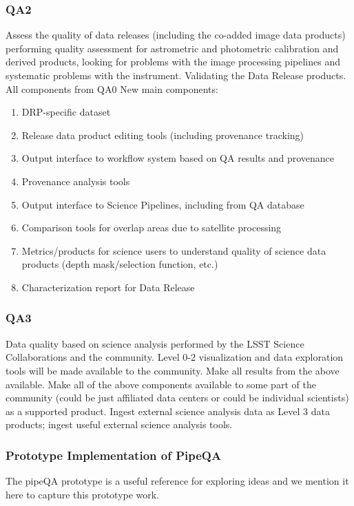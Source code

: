 \subsubsection{QA2}
Assess the quality of data releases (including the co-added image data products) performing quality assessment for astrometric and photometric calibration and derived products, looking for problems with the image processing pipelines and systematic problems with the instrument.
Validating the Data Release products.
All components from QA0
New main components:
\begin{enumerate}
\item DRP-specific dataset
\item Release data product editing tools (including provenance tracking)
\item Output interface to workflow system based on QA results and provenance
\item Provenance analysis tools
\item Output interface to Science Pipelines, including from QA database
\item Comparison tools for overlap areas due to satellite processing
\item Metrics/products for science users to understand quality of science data products (depth mask/selection function, etc.)
\item Characterization report for Data Release
\end{enumerate}

\subsubsection{QA3}
Data quality based on science analysis performed by the LSST Science Collaborations and the community. Level 0-2 visualization and data exploration tools will be made available to the community.
Make all results from the above available. Make all of the above components available to some part of the community (could be just affiliated data centers or could be individual scientists) as a supported product.
Ingest external science analysis data as Level 3 data products; ingest useful external science analysis tools.

\subsubsection{Prototype Implementation of PipeQA}

The pipeQA prototype is a useful reference for exploring ideas and we mention
it here to capture this prototype work.

